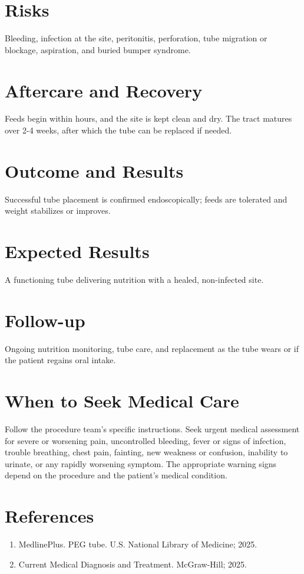 \section*{Risks}
Bleeding, infection at the site, peritonitis, perforation, tube migration or blockage, aspiration, and buried bumper syndrome.

\section*{Aftercare and Recovery}
Feeds begin within hours, and the site is kept clean and dry. The tract matures over 2-4 weeks, after which the tube can be replaced if needed.

\section*{Outcome and Results}
Successful tube placement is confirmed endoscopically; feeds are tolerated and weight stabilizes or improves.

\section*{Expected Results}
A functioning tube delivering nutrition with a healed, non-infected site.

\section*{Follow-up}
Ongoing nutrition monitoring, tube care, and replacement as the tube wears or if the patient regains oral intake.

\section*{When to Seek Medical Care}
Follow the procedure team's specific instructions. Seek urgent medical assessment for severe or worsening pain, uncontrolled bleeding, fever or signs of infection, trouble breathing, chest pain, fainting, new weakness or confusion, inability to urinate, or any rapidly worsening symptom. The appropriate warning signs depend on the procedure and the patient's medical condition.

\section*{References}
\begin{enumerate}
  \item MedlinePlus. PEG tube. U.S. National Library of Medicine; 2025.
  \item Current Medical Diagnosis and Treatment. McGraw-Hill; 2025.
\end{enumerate}

\clearpage
